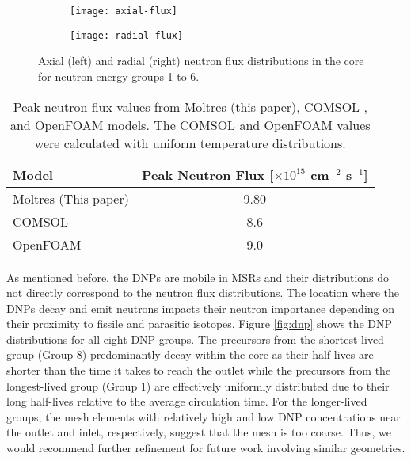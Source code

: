 \begin{figure}[t!]
    \centering
    \begin{subfigure}[t]{.49\textwidth}
        \centering
        \texttt{[image: axial-flux]}
    \end{subfigure}
    \begin{subfigure}[t]{.49\textwidth}
        \centering
        \texttt{[image: radial-flux]}
    \end{subfigure}
    \caption{Axial (left) and radial (right) neutron flux distributions in the
    core for neutron energy groups 1 to 6.}
    \label{fig:axialradial}
\end{figure}

\begin{table}[t!]
	\centering
	\caption{Peak neutron flux values from Moltres (this paper), COMSOL
	\cite{fiorina_molten_2013}, and OpenFOAM \cite{aufiero_development_2014}
	models. The COMSOL and OpenFOAM values were calculated with uniform
	temperature distributions.}
	\begin{tabular}{l S}
		\toprule
		{Model} & {Peak Neutron Flux [$\times 10^{15}$ cm$^{-2}$ s$^{-1}$]}
		\\
		\midrule
		{Moltres (This paper)} & 9.80\\
		{COMSOL} & 8.6 \\
		{OpenFOAM} & 9.0 \\
		\bottomrule
	\end{tabular}
	\label{table:peak-flux}
\end{table}

As mentioned before, the \glspl{DNP} are mobile in \glspl{MSR} and their
distributions do not directly correspond to the neutron flux distributions.
The location where the \glspl{DNP} decay and emit neutrons impacts their
neutron
importance depending on their proximity to fissile and parasitic isotopes.
Figure \ref{fig:dnp} shows the \gls{DNP} distributions for all eight \gls{DNP}
groups. The
precursors from the shortest-lived group (Group 8) predominantly decay within
the core as their half-lives are shorter than the time it takes to reach the
outlet while the precursors from the longest-lived group (Group 1) are
effectively uniformly distributed due to their long half-lives relative to the
average circulation time. For the longer-lived groups, the mesh elements with
relatively high and low \gls{DNP} concentrations near the outlet and inlet,
respectively, suggest that the mesh is too coarse. Thus, we would recommend
further refinement for future work involving similar geometries.

